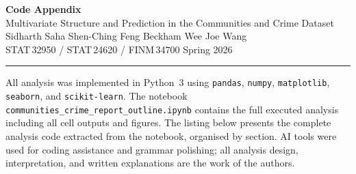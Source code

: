 \documentclass[10pt,letterpaper]{article}
\begin{document}
\begin{center}
  {\large\bfseries Code Appendix}\\[6pt]
  Multivariate Structure and Prediction in the Communities and Crime Dataset\\[3pt]
  {\small Sidharth Saha \quad Shen-Ching Feng \quad Beckham Wee \quad Joe Wang}\\[3pt]
  {\small STAT\,32950 / STAT\,24620 / FINM\,34700 \quad Spring 2026}
\end{center}
\vspace{2pt}\hrule\vspace{8pt}

All analysis was implemented in Python~3 using \texttt{pandas}, \texttt{numpy},
\texttt{matplotlib}, \texttt{seaborn}, and \texttt{scikit-learn}.
The notebook \texttt{communities\_crime\_report\_outline.ipynb} contains the
full executed analysis including all cell outputs and figures.
The listing below presents the complete analysis code extracted from the notebook,
organised by section. AI tools were used for coding assistance and grammar
polishing; all analysis design, interpretation, and written explanations are
the work of the authors.

\bigskip

\end{document}
